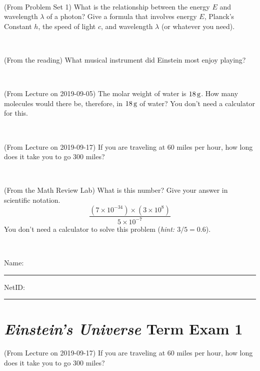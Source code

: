 \documentclass[12pt, letterpaper]{article}
\begin{document}
\vfill ~

\begin{problem} (From Problem Set 1)
What is the relationship between the energy $E$ and wavelength
$\lambda$ of a photon? Give a formula that involves energy $E$,
Planck's Constant $h$, the speed of light $c$, and wavelength
$\lambda$ (or whatever you need).
\end{problem}

\vfill ~


\clearpage


\begin{problem} (From the reading)
What musical instrument did Einstein most enjoy playing?
\end{problem}


\vfill ~

\begin{problem} (From Lecture on 2019-09-05)
The molar weight of water is $18\,\mathrm{g}$. How many molecules would there
be, therefore, in $18\,\mathrm{g}$ of water? You don't need a calculator for
this.
\end{problem}


\vfill ~

\begin{problem} (From Lecture on 2019-09-17)
If you are traveling at 60 miles per hour, how long does
it take you to go 300 miles?
\end{problem}


\vfill ~

\begin{problem} (From the Math Review Lab)
What is this number? Give your answer in scientific notation.
$$
\frac{(7\times10^{-34})\times(3\times10^8)}{5\times10^{-7}}
$$
You don't need a calculator to solve this problem (\textit{hint: $3/5=0.6$}).
\end{problem}


\vfill ~


\cleardoublepage



\noindent
Name: \rule[-1ex]{0.60\textwidth}{0.1pt}
NetID: \rule[-1ex]{0.20\textwidth}{0.1pt}

\section*{\textsl{Einstein's Universe} Term Exam 1}
\setcounter{problem}{1}


\begin{problem} (From Lecture on 2019-09-17)
If you are traveling at 60 miles per hour, how long does
it take you to go 300 miles?
\end{problem}
\end{document}
